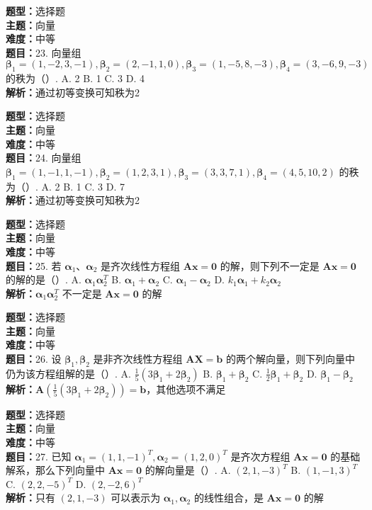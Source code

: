 \documentclass{ctexart}
\newenvironment{question}[5]{%
	\noindent\textbf{题型：}#1\\
	\textbf{主题：}#2\\
	\textbf{难度：}#3\\
	\textbf{题目：}#4\\
	\textbf{解析：}#5\\
	\vspace{1em}
}{}
\begin{document}
	\begin{question}
		{选择题}
		{向量}
		{中等}
		{23. 向量组 \(\boldsymbol{\beta}_1=(1,-2,3,-1), \boldsymbol{\beta}_2=(2,-1,1,0), \boldsymbol{\beta}_3=(1,-5,8,-3), \boldsymbol{\beta}_4=(3,-6,9,-3)\) 的秩为（）. 
			A. 2
			B. 1
			C. 3
			D. 4}
		{通过初等变换可知秩为2}
	\end{question}
	
	\begin{question}
		{选择题}
		{向量}
		{中等}
		{24. 向量组 \(\boldsymbol{\beta}_1=(1,-1,1,-1), \boldsymbol{\beta}_2=(1,2,3,1), \boldsymbol{\beta}_3=(3,3,7,1), \boldsymbol{\beta}_4=(4,5,10,2)\) 的秩为（）. 
			A. 2
			B. 1
			C. 3
			D. 7}
		{通过初等变换可知秩为2}
	\end{question}
	
	\begin{question}
		{选择题}
		{向量}
		{中等}
		{25. 若 \(\boldsymbol{\alpha}_1、\boldsymbol{\alpha}_2\) 是齐次线性方程组 \(\mathbf{A}\mathbf{x}=\mathbf{0}\) 的解，则下列不一定是 \(\mathbf{A}\mathbf{x}=\mathbf{0}\) 的解的是（）. 
			A. \(\boldsymbol{\alpha}_1\boldsymbol{\alpha}_2^T\)
			B. \(\boldsymbol{\alpha}_1+\boldsymbol{\alpha}_2\)
			C. \(\boldsymbol{\alpha}_1-\boldsymbol{\alpha}_2\)
			D. \(k_1\boldsymbol{\alpha}_1+k_2\boldsymbol{\alpha}_2\)}
		{\(\boldsymbol{\alpha}_1\boldsymbol{\alpha}_2^T\) 不一定是 \(\mathbf{A}\mathbf{x}=\mathbf{0}\) 的解}
	\end{question}
	
	\begin{question}
		{选择题}
		{向量}
		{中等}
		{26. 设 \(\boldsymbol{\beta}_1, \boldsymbol{\beta}_2\) 是非齐次线性方程组 \(\mathbf{A}\mathbf{X}=\mathbf{b}\) 的两个解向量，则下列向量中仍为该方程组解的是（）. 
			A. \(\frac{1}{5}(3\boldsymbol{\beta}_1+2\boldsymbol{\beta}_2)\)
			B. \(\boldsymbol{\beta}_1+\boldsymbol{\beta}_2\)
			C. \(\frac{1}{2}\boldsymbol{\beta}_1+\boldsymbol{\beta}_2\)
			D. \(\boldsymbol{\beta}_1-\boldsymbol{\beta}_2\)}
		{\(\mathbf{A}(\frac{1}{5}(3\boldsymbol{\beta}_1+2\boldsymbol{\beta}_2))=\mathbf{b}\)，其他选项不满足}
	\end{question}
	
	\begin{question}
		{选择题}
		{向量}
		{中等}
		{27. 已知 \(\boldsymbol{\alpha}_1=(1,1,-1)^T, \boldsymbol{\alpha}_2=(1,2,0)^T\) 是齐次方程组 \(\mathbf{A}\mathbf{x}=\mathbf{0}\) 的基础解系，那么下列向量中 \(\mathbf{A}\mathbf{x}=\mathbf{0}\) 的解向量是（）. 
			A. \((2,1,-3)^T\)
			B. \((1,-1,3)^T\)
			C. \((2,2,-5)^T\)
			D. \((2,-2,6)^T\)}
		{只有 \((2,1,-3)\) 可以表示为 \(\boldsymbol{\alpha}_1, \boldsymbol{\alpha}_2\) 的线性组合，是 \(\mathbf{A}\mathbf{x}=\mathbf{0}\) 的解}
	\end{question}
	
\end{document}
